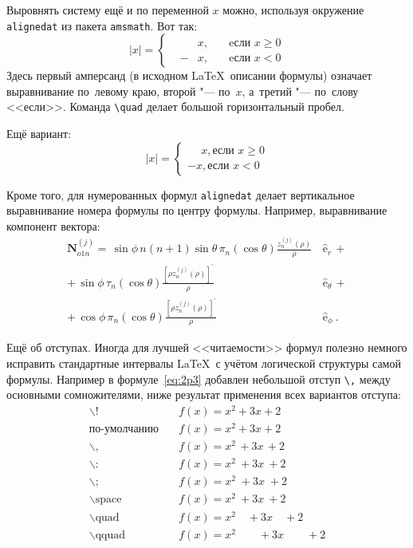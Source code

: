 Выровнять систему ещё и по переменной \( x \) можно, используя окружение
\verb|alignedat| из пакета \verb|amsmath|. Вот так:
\[
    |x| = \left\{
    \begin{alignedat}{2}
        &&x, \quad &\text{eсли } x\geqslant 0 \\
        &-&x, \quad & \text{eсли } x<0
    \end{alignedat}
    \right.
\]
Здесь первый амперсанд (в исходном \LaTeX\ описании формулы) означает
выравнивание по~левому краю, второй "--- по~\( x \), а~третий "--- по~слову
<<если>>. Команда \verb|\quad| делает большой горизонтальный пробел.

Ещё вариант:
\[
    |x|=
    \begin{cases}
    \phantom{-}x, \text{если } x \geqslant 0 \\
    -x, \text{если } x<0
    \end{cases}
\]

Кроме того, для  нумерованных формул \verb|alignedat| делает вертикальное
выравнивание номера формулы по центру формулы. Например, выравнивание
компонент вектора:
\begin{equation}
\label{eq:2p3}
\begin{alignedat}{2}
{\mathbf{N}}_{o1n}^{(j)} = \,{\sin} \phi\,n\!\left(n+1\right)
         {\sin}\theta\,
         \pi_n\!\left({\cos} \theta\right)
         \frac{
               z_n^{(j)}\!\left( \rho \right)
              }{\rho}\,
           &{\boldsymbol{\hat{\mathrm e}}}_{r}\,+   \\
+\,
{\sin} \phi\,
         \tau_n\!\left({\cos} \theta\right)
         \frac{
            \left[\rho z_n^{(j)}\!\left( \rho \right)\right]^{\prime}
              }{\rho}\,
            &{\boldsymbol{\hat{\mathrm e}}}_{\theta}\,+   \\
+\,
{\cos} \phi\,
         \pi_n\!\left({\cos} \theta\right)
         \frac{
            \left[\rho z_n^{(j)}\!\left( \rho \right)\right]^{\prime}
              }{\rho}\,
            &{\boldsymbol{\hat{\mathrm e}}}_{\phi}\:.
\end{alignedat}
\end{equation}

Ещё об отступах. Иногда для лучшей <<читаемости>> формул полезно
немного исправить стандартные интервалы \LaTeX\ с учётом логической
структуры самой формулы. Например в формуле~\ref{eq:2p3} добавлен
небольшой отступ \verb+\,+ между основными сомножителями, ниже
результат применения всех вариантов отступа:
\begin{align*}
\backslash! &\quad f(x) = x^2\! +3x\! +2 \\
  \mbox{по-умолчанию} &\quad f(x) = x^2+3x+2 \\
\backslash, &\quad f(x) = x^2\, +3x\, +2 \\
\backslash{:} &\quad f(x) = x^2\: +3x\: +2 \\
\backslash; &\quad f(x) = x^2\; +3x\; +2 \\
\backslash \mbox{space} &\quad f(x) = x^2\ +3x\ +2 \\
\backslash \mbox{quad} &\quad f(x) = x^2\quad +3x\quad +2 \\
\backslash \mbox{qquad} &\quad f(x) = x^2\qquad +3x\qquad +2
\end{align*}

